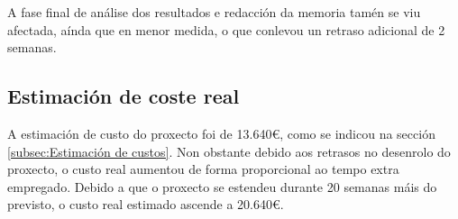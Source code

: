 A fase final de análise dos resultados e redacción da memoria tamén se viu afectada, aínda que en menor medida, o que conlevou un retraso adicional de 2 semanas.

\subsection{Estimación de coste real}
\label{subsec:Estimación de custo real}

A estimación de custo do proxecto foi de 13.640€, como se indicou na sección \ref{subsec:Estimación de custos}. Non obstante debido aos retrasos no desenrolo do proxecto, o custo real aumentou de forma proporcional ao tempo extra empregado. 
Debido a que o proxecto se estendeu durante 20 semanas máis do previsto, o custo real estimado ascende a 20.640€.